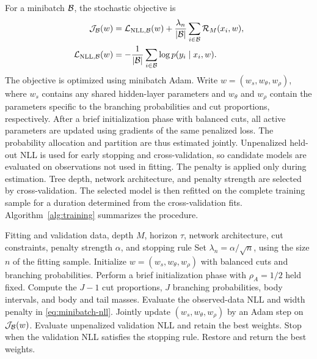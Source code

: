 \documentclass[11pt]{article}
\numberwithin{equation}{section}
\begin{document}
For a minibatch $\mathcal{B}$, the stochastic objective is
\begin{equation}
    \begin{aligned}
    \mathcal J_{\mathcal{B}}(w)
    &=\mathcal{L}_{\mathrm{NLL},\mathcal{B}}(w)
      +\frac{\lambda_n}{|\mathcal{B}|}
         \sum_{i\in\mathcal{B}}\mathcal R_M(x_i,w),\\
    \mathcal{L}_{\mathrm{NLL},\mathcal{B}}(w)
    &=-\frac{1}{|\mathcal{B}|}\sum_{i\in\mathcal{B}}\log p(y_i\mid x_i,w).
    \end{aligned}
    \label{eq:minibatch-nll}
\end{equation}
The objective is optimized using minibatch Adam. Write $w=(w_s,w_\theta,w_\rho)$, where $w_s$ contains any shared hidden-layer parameters and $w_\theta$ and $w_\rho$ contain the parameters specific to the branching probabilities and cut proportions, respectively. After a brief initialization phase with balanced cuts, all active parameters are updated using gradients of the same penalized loss. The probability allocation and partition are thus estimated jointly. Unpenalized held-out NLL is used for early stopping and cross-validation, so candidate models are evaluated on observations not used in fitting. The penalty is applied only during estimation. Tree depth, network architecture, and penalty strength are selected by cross-validation. The selected model is then refitted on the complete training sample for a duration determined from the cross-validation fits. Algorithm~\ref{alg:training} summarizes the procedure.

\begin{algorithm}[H]
\caption{Penalized likelihood training for the adaptive Neural Regression Tree}
\label{alg:training}
\begin{algorithmic}[1]
\Require Fitting and validation data, depth $M$, horizon $\tau$, network architecture, cut constraints, penalty strength $\alpha$, and stopping rule
\State Set $\lambda_n=\alpha/\sqrt n$, using the size $n$ of the fitting sample.
\State Initialize $w=(w_s,w_\theta,w_\rho)$ with balanced cuts and branching probabilities.
\State Perform a brief initialization phase with $\rho_A=1/2$ held fixed.
        \State Compute the $J-1$ cut proportions, $J$ branching probabilities, body intervals, and body and tail masses.
        \State Evaluate the observed-data NLL and width penalty in \eqref{eq:minibatch-nll}.
        \State Jointly update $(w_s,w_\theta,w_\rho)$ by an Adam step on $\mathcal J_{\mathcal{B}}(w)$.
    \EndFor
    \State Evaluate unpenalized validation NLL and retain the best weights.
    \State Stop when the validation NLL satisfies the stopping rule.
\EndFor
\State Restore and return the best weights.
\end{algorithmic}
\end{algorithm}
\end{document}

